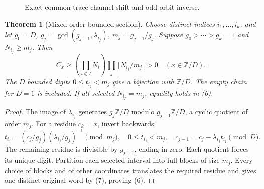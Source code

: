 \documentclass[10pt,reqno]{amsart}
\newtheorem{theorem}{Theorem}\newtheorem{proposition}[theorem]{Proposition}
\begin{document}
\begin{figure}[ht]
\centering

\caption{Exact common-trace channel shift and odd-orbit inverse.}
\end{figure}

\begin{theorem}[Mixed-order bounded section]
Choose distinct indices $i_1,\ldots,i_k$, and let
$g_0=D$, $g_j=\gcd(g_{j-1},\lambda_{i_j})$, $m_j=g_{j-1}/g_j$.
Suppose $g_0>\cdots>g_k=1$ and $N_{i_j}\ge m_j$. Then
\[
 C_x\ge(\prod_{i\notin I}N_i)
          \prod_j\lfloor N_{i_j}/m_j\rfloor>0\quad(x\in\mathbb Z/D).       \tag{6}
\]
The $D$ bounded digits $0\le t_{i_j}<m_j$ give a bijection with $\mathbb Z/D$.
The empty chain for $D=1$ is included. If all selected $N_{i_j}=m_j$, equality
holds in (6).
\end{theorem}
\begin{proof}
The image of $\lambda_{i_j}$ generates
$g_j\mathbb Z/D$ modulo $g_{j-1}\mathbb Z/D$, a cyclic quotient of order $m_j$.
For a residue $c_k=x$, invert backwards:
\[
 t_{i_j}=(c_j/g_j)(\lambda_{i_j}/g_j)^{-1}\pmod{m_j},\quad
 0\le t_{i_j}<m_j,\quad c_{j-1}=c_j-\lambda_{i_j}t_{i_j}\pmod D.          \tag{7}
\]
The remaining residue is divisible by $g_{j-1}$, ending in zero. Each quotient
forces its unique digit. Partition each selected interval into full blocks of
size $m_j$. Every choice of blocks and of other coordinates translates the
required residue and gives one distinct original word by (7), proving (6).
\end{proof}
\end{document}
